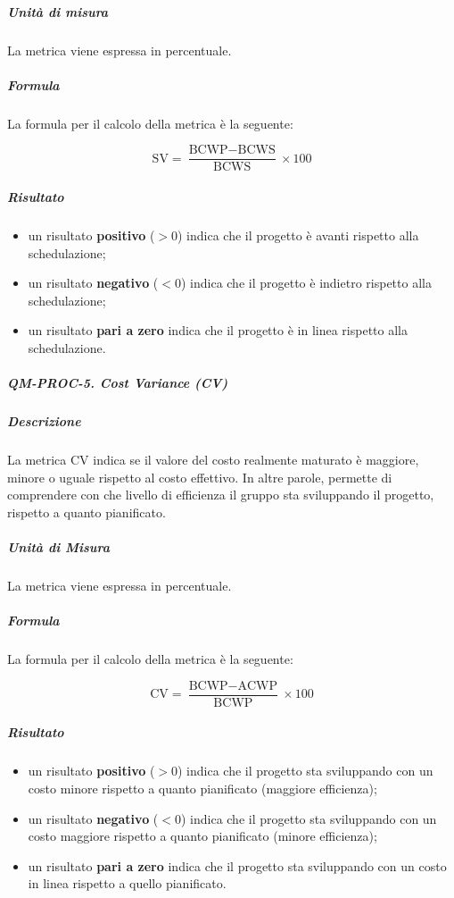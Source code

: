 				\subparagraph{Unità di misura}
				La metrica viene espressa in percentuale. 

				\subparagraph{Formula}
				La formula per il calcolo della metrica è la seguente:

				\[
					\text{SV} = \frac{\text{BCWP} - \text{BCWS}}{\text{BCWS}} \times 100
				\]
				
				\subparagraph{Risultato} 
				\begin{itemize}
					\item un risultato \textbf{positivo} (\(> 0\)) indica che il progetto è avanti rispetto alla schedulazione;
					\item un risultato \textbf{negativo} (\(< 0\)) indica che il progetto è indietro rispetto alla schedulazione;
					\item un risultato \textbf{pari a zero} indica che il progetto è in linea rispetto alla schedulazione.
				\end{itemize}

			\subparagraph{QM-PROC-5. Cost Variance (CV)} 

				\subparagraph{Descrizione}
				La metrica CV indica se il valore del costo realmente maturato è maggiore, minore o uguale rispetto al costo effettivo. In altre parole, permette di comprendere con che livello di efficienza il gruppo sta sviluppando il progetto, rispetto a quanto pianificato. 

				\subparagraph{Unità di Misura}
				La metrica viene espressa in percentuale. 

				\subparagraph{Formula}
				La formula per il calcolo della metrica è la seguente:

				\[
					\text{CV} = \frac{\text{BCWP} - \text{ACWP}}{\text{BCWP}} \times 100
				\]
				
				\subparagraph{Risultato}
				\begin{itemize}
					\item un risultato \textbf{positivo} (\(> 0\)) indica che il progetto sta sviluppando con un costo minore rispetto a quanto pianificato (maggiore efficienza);
					\item un risultato \textbf{negativo} (\(< 0\)) indica che il progetto sta sviluppando con un costo maggiore rispetto a quanto pianificato (minore efficienza);
					\item un risultato \textbf{pari a zero} indica che il progetto sta sviluppando con un costo in linea rispetto a quello pianificato.
				\end{itemize}



